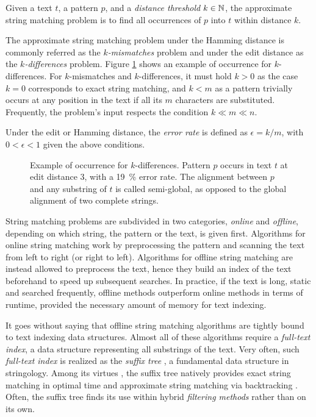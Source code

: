 \begin{definition}
\citep{Galil1988}
Given a text $t$, a pattern $p$, and a \emph{distance threshold} $k \in \mathbb {N}$, the approximate string matching problem is to find all occurrences of $p$ into $t$ within distance $k$.
\end{definition}
The approximate string matching problem under the Hamming distance is commonly referred as the \emph{$k$-mismatches} problem and under the edit distance as the \emph{$k$-differences} problem.
Figure \ref{fig:edit-occurrence} shows an example of occurrence for $k$-differences.
For $k$-mismatches and $k$-differences, it must hold $k > 0$ as the case $k = 0$ corresponds to exact string matching, and $k < m$ as a pattern trivially occurs at any position in the text if all its $m$ characters are substituted.
Frequently, the problem's input respects the condition $k \ll m \ll n$.
\begin{definition}
Under the edit or Hamming distance, the \emph{error rate} is defined as $\epsilon = k/m$, with $0 < \epsilon < 1$ given the above conditions.
\end{definition}

\begin{figure}[h]
\begin{center}
\caption[Example of occurrence for $k$-differences]{Example of occurrence for $k$-differences. Pattern $p$ occurs in text $t$ at edit distance 3, \ie with a 19~\% error rate.
The alignment between $p$ and any substring of $t$ is called semi-global, as opposed to the global alignment of two complete strings.
}
\label{fig:edit-occurrence}

\end{center}
\end{figure}

String matching problems are subdivided in two categories, \emph{online} and \emph{offline}, depending on which string, the pattern or the text, is given first.
Algorithms for online string matching work by preprocessing the pattern and scanning the text from left to right (or right to left).
Algorithms for offline string matching are instead allowed to preprocess the text,
hence they build an index of the text beforehand to speed up subsequent searches.
In practice, if the text is long, static and searched frequently, offline methods outperform online methods in terms of runtime, provided the necessary amount of memory for text indexing.

It goes without saying that offline string matching algorithms are tightly bound to text indexing data structures.
Almost all of these algorithms require a \emph{full-text index}, \ie a data structure representing all substrings of the text.
Very often, such \emph{full-text index} is realized as the \emph{suffix tree} \citep{Weiner1973}, a fundamental data structure in stringology.
Among its virtues \citep{Apostolico1985}, the suffix tree natively provides exact string matching in optimal time and approximate string matching via backtracking \citep{Ukkonen1993}.
Often, the suffix tree finds its use within hybrid \emph{filtering methods} rather than on its own.


